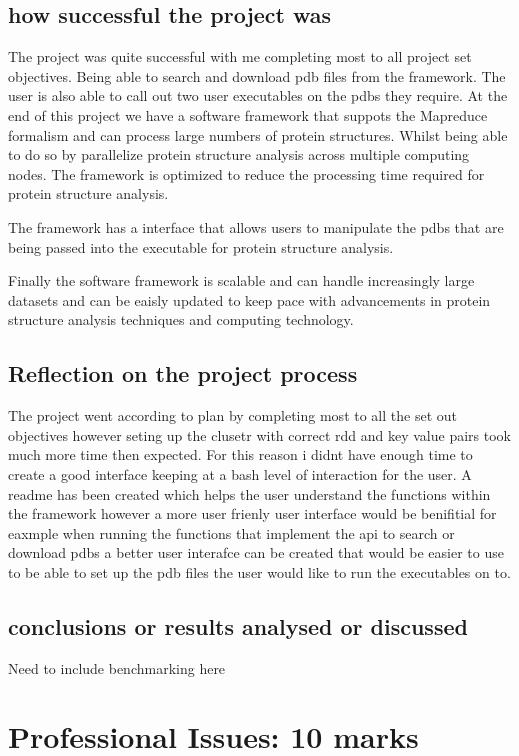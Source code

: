 \documentclass[]{final_report}
\begin{document}
\subsection{how successful the project was}

The project was quite successful with me completing most to all project set objectives. Being able to search and download pdb files from the framework. The user is also able to call out two user executables on the pdbs they require. At the end of this project we have a software framework that suppots the Mapreduce formalism and can process large numbers of protein structures. Whilst being able to do so by parallelize protein structure analysis across multiple computing nodes. The framework is optimized to reduce the processing time required for protein structure analysis.

The framework has a interface that allows users to manipulate the pdbs that are being passed into the executable for protein structure analysis.

Finally the software framework is scalable and can handle increasingly large datasets and can be eaisly updated to keep pace with advancements in protein structure analysis techniques and computing technology.

\subsection{Reflection on the project process}

The project went according to plan by completing most to all the set out objectives however seting up the clusetr with correct rdd and key value pairs took much more time then expected. For this reason i didnt have enough time to create a good interface keeping at a bash level of interaction for the user. A readme has been created which helps the user understand the functions within the framework however a more user frienly user interface would be benifitial for eaxmple when running the functions that implement the api to search or download pdbs a better user interafce can be created that would be easier to use to be able to set up the pdb files the user would like to run the executables on to.

\subsection{conclusions or results analysed or discussed}
Need to include benchmarking here

\section{Professional Issues: 10 marks}
\end{document}
